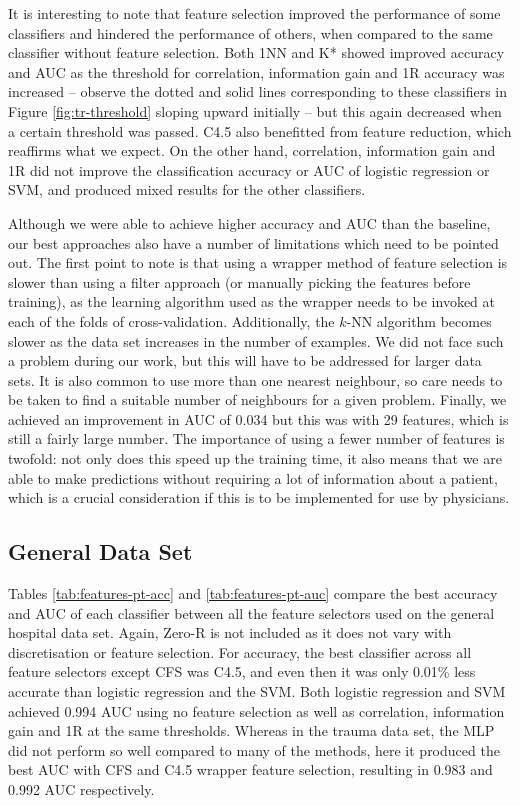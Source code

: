 It is interesting to note that feature selection improved the performance of
some classifiers and hindered the performance of others, when compared to the
same classifier without feature selection. Both 1NN and K* showed improved
accuracy and AUC as the threshold for correlation, information gain and 1R
accuracy was increased -- observe the dotted and solid lines corresponding
to these classifiers in Figure \ref{fig:tr-threshold} sloping upward initially
-- but this again decreased when a certain threshold was passed. C4.5 also
benefitted from feature reduction, which reaffirms what we expect. On the other
hand, correlation, information gain and 1R did not improve the classification
accuracy or AUC of logistic regression or SVM, and produced mixed results for
the other classifiers.

Although we were able to achieve higher accuracy and AUC than the baseline,
our best approaches also have a number of limitations which need to be pointed
out. The first point to note is that using a wrapper method of feature
selection is slower than using a filter approach (or manually picking the
features before training), as the learning algorithm used as the wrapper
needs to be invoked at each of the folds of cross-validation. Additionally,
the $k$-NN algorithm becomes slower as the data set increases in the number
of examples. We did not face such a problem during our work, but this will
have to be addressed for larger data sets. It is also common to use more
than one nearest neighbour, so care needs to be taken to find a suitable number
of neighbours for a given problem. Finally, we achieved an improvement
in AUC of 0.034 but this was with 29 features, which is still a fairly large
number. The importance of using a fewer number of features is twofold: not
only does this speed up the training time, it also means that we are able to
make predictions without requiring a lot of information about a patient,
which is a crucial consideration if this is to be implemented for use by
physicians.

\subsection{General Data Set}
Tables \ref{tab:features-pt-acc} and \ref{tab:features-pt-auc} compare the
best accuracy and AUC of each classifier between all the feature selectors
used on the general hospital data set. Again, Zero-R is not included as it
does not vary with discretisation or feature selection. For accuracy, the
best classifier across all feature selectors except CFS was C4.5, and even
then it
was only 0.01\% less accurate than logistic regression and the SVM. Both
logistic regression and SVM achieved 0.994 AUC using no feature selection
as well as correlation, information gain and 1R at the same thresholds. Whereas
in the trauma data set, the MLP did not perform so well compared to many of the
methods, here it produced the best AUC with CFS and C4.5 wrapper feature
selection, resulting in 0.983 and 0.992 AUC respectively.




